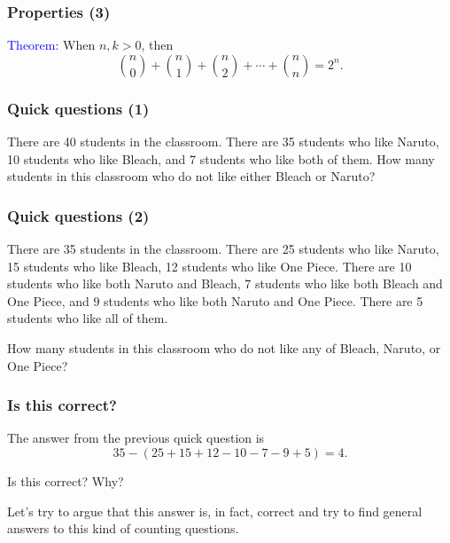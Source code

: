 \begin{frame}\frametitle{Properties (3)}
  \textcolor{blue}{Theorem:} When $n,k>0$, then
  $${n\choose 0}+{n\choose 1}+{n\choose 2}+\cdots+{n\choose n}=2^n.$$

  \vspace{2.5in}
\end{frame}

\begin{frame}\frametitle{Quick questions (1)}
  \begin{tcolorbox}
    There are 40 students in the classroom.  There are 35 students who
    like Naruto, 10 students who like Bleach, and 7 students who like
    both of them.  How many students in this classroom who do not like
    either Bleach or Naruto?
  \end{tcolorbox}

  \vspace{2in}
\end{frame}

\begin{frame}\frametitle{Quick questions (2)}
  \begin{tcolorbox}
    There are 35 students in the classroom.  There are 25 students who
    like Naruto, 15 students who like Bleach, 12 students who like One
    Piece.  There are 10 students who like both Naruto and Bleach, 7
    students who like both Bleach and One Piece, and 9 students who
    like both Naruto and One Piece.  There are 5 students who like all
    of them.

    How many students in this classroom who do not like any of Bleach,
    Naruto, or One Piece?
  \end{tcolorbox}

  \vspace{1.2in}
\end{frame}

\begin{frame}\frametitle{Is this correct?}
  The answer from the previous quick question is
  \[ 35 - (25 + 15 + 12 - 10 - 7 - 9 + 5) = 4.\]

  Is this correct?  Why?

  \pause

  \vspace{0.2in}

  Let's try to argue that this answer is, in fact, correct and try to
  find general answers to this kind of counting questions.
\end{frame}

